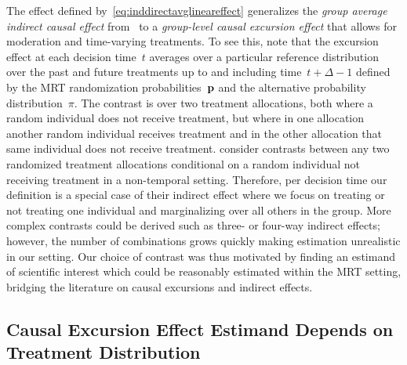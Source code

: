 \documentclass[lineno]{biometrika}
\def\E{\mathbb{E}}
\begin{document}
\begin{remark}
The effect defined by~\eqref{eq:inddirectavglineareffect} generalizes the \emph{group average indirect causal effect} from~\cite{Tchetgen2012} to a \emph{group-level causal excursion effect} that allows for moderation and time-varying treatments. To see this, note that the excursion effect at each decision time~$t$ averages over a particular reference distribution over the past and future treatments up to and including time~$t+\Delta-1$ defined by the MRT randomization probabilities~$\bf p$ and the alternative probability distribution~$\pi$.  The contrast is over two treatment allocations, both where a random individual does not receive treatment, but where in one allocation another random individual receives treatment and in the other allocation that same individual does not receive treatment. \cite{Tchetgen2012} consider contrasts between any two randomized treatment allocations conditional on a random individual not receiving treatment in a non-temporal setting.  Therefore, per decision time our definition is a special case of their indirect effect where we focus on treating or not treating one individual and marginalizing over all others in the group.  More complex contrasts could be derived such as three- or four-way indirect effects; however, the number of combinations grows quickly making estimation unrealistic in our setting. Our choice of contrast was thus motivated by finding an estimand of scientific interest which could be reasonably estimated within the MRT setting, bridging the literature on causal excursions and indirect effects.  
\end{remark}

\subsection{Causal Excursion Effect Estimand Depends on Treatment Distribution}

\end{document}
